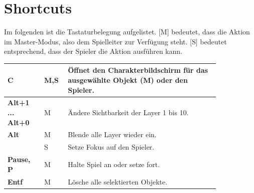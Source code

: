 \documentclass[german,10pt,a4paper,twocolumn,colorscheme=darkblue]{orarticle}
\begin{document}
%	
			
	\section{Shortcuts}
		Im folgenden ist die Tastaturbelegung aufgelistet. [M] bedeutet, dass die Aktion im Master-Modus, also dem Spielleiter zur Verfügung steht. [S] bedeutet entsprechend, dass der Spieler die Aktion ausführen kann.\\
		
		\begin{tabular}{p{0.15\linewidth}|p{0.075\linewidth}|p{0.62\linewidth}}
			\textbf{C}               & M,S & Öffnet den Charakterbildschirm für das ausgewählte Objekt (M) oder den Spieler. \\\hline
			\textbf{Alt+1 ... Alt+0} & M & Ändere Sichtbarkeit der Layer 1 bis 10. \\\hline
			\textbf{Alt}             & M & Blende alle Layer wieder ein.\\
			                         & S & Setze Fokus auf den Spieler.\\\hline
			\textbf{Pause, P}		 & M & Halte Spiel an oder setze fort.\\\hline
			\textbf{Entf}			 & M & Lösche alle selektierten Objekte.
		\end{tabular}
	
	
\end{document}
